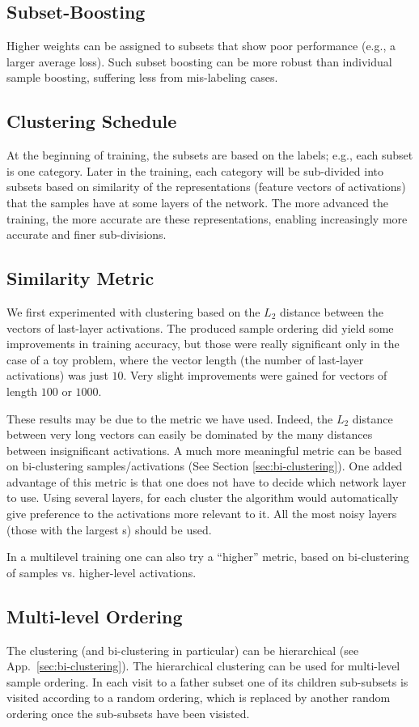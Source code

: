\documentclass{article} %
\begin{document}
\subsection{Subset-Boosting}
Higher weights can be assigned to subsets that show poor performance (e.g., a larger average loss). Such subset boosting can be more robust than individual sample boosting, suffering less from mis-labeling cases. 

\subsection{Clustering Schedule}
At the beginning of training, the subsets are based on the labels; e.g., each subset is one category. Later in the training, each category will be sub-divided into subsets based on similarity of the representations (feature vectors of activations) that the samples have at some layers of the network. The more advanced the training, the more accurate are these representations, enabling increasingly more accurate and finer sub-divisions.

\subsection{Similarity Metric}
We first experimented with clustering based on the $L_2$ distance between the vectors of last-layer activations. The produced sample ordering did yield some improvements in training accuracy, but those were really significant only in the case of a toy problem, where the vector length (the number of last-layer activations) was just $10$. Very slight improvements were gained for vectors of length $100$ or $1000$. 

These results may be due to the metric we have used. Indeed, the $L_2$ distance between very long vectors can easily be dominated by the many distances between insignificant activations. A much more meaningful metric can be based on bi-clustering samples/activations (See Section \ref{sec:bi-clustering}). One added advantage of this metric is that one does not have to decide which network layer to use. Using several layers, for each cluster the algorithm would automatically give preference to the activations more relevant to it. All the most noisy layers (those with the largest {\NAL}s) should be used. 

In a multilevel training one can also try a ``higher'' metric, based on bi-clustering of samples vs. higher-level activations.

\subsection{Multi-level Ordering}
The clustering (and bi-clustering in particular) can be hierarchical (see App.~\ref{sec:bi-clustering}). The hierarchical clustering can be used for multi-level sample ordering. In each visit to a father subset one of its children sub-subsets is visited according to a random ordering, which is replaced by another random ordering once the sub-subsets have been visisted.
\end{document}
